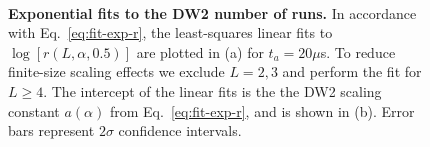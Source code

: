 \begin{figure}[t]
\begin{center}
\\
\caption{\textbf{Exponential fits to the DW2 number of runs.} In accordance with Eq.~\eqref{eq:fit-exp-r}, the least-squares linear fits to $\log[r(L,\alpha,0.5)]$ are plotted in (a) for $t_a=20\mu$s. To reduce finite-size scaling effects we exclude $L=2,3$ and perform the fit for $L\geq 4$. The intercept of the linear fits is the the DW2 scaling constant $a(\alpha)$ from Eq.~\eqref{eq:fit-exp-r}, and is shown in (b). Error bars represent $2\sigma$ confidence intervals.}
\end{center}
\end{figure}

